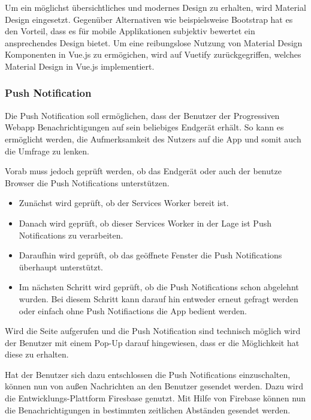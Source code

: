 Um ein möglichst übersichtliches und modernes Design zu erhalten, wird Material Design eingesetzt. Gegenüber Alternativen wie beispielsweise Bootstrap hat es den Vorteil, dass es für mobile Applikationen subjektiv bewertet ein ansprechendes Design bietet. Um eine reibungslose Nutzung von Material Design Komponenten in Vue.js zu ermögichen, wird auf Vuetify zurückgegriffen, welches Material Design in Vue.js implementiert.

\subsubsection{Push Notification}
Die Push Notification soll ermöglichen, dass der Benutzer der Progressiven Webapp Benachrichtigungen auf sein beliebiges Endgerät erhält. So kann es ermöglicht werden, die Aufmerksamkeit des Nutzers auf die App und somit auch die Umfrage zu lenken. 

Vorab muss jedoch geprüft werden, ob das Endgerät oder auch der benutze Browser die Push Notifications unterstützen. 

\begin{itemize}
\item Zunächst wird geprüft, ob der Services Worker bereit ist. 
\item Danach wird geprüft, ob dieser Services Worker in der Lage ist Push Notifications zu verarbeiten.
\item Daraufhin wird geprüft, ob das geöffnete Fenster die Push Notifications überhaupt unterstützt.
\item Im nächsten Schritt wird geprüft, ob die Push Notifications schon abgelehnt wurden. Bei diesem Schritt kann darauf hin entweder erneut gefragt werden oder einfach ohne Push Notifiactions die App bedient werden.
\end{itemize} 

Wird die Seite aufgerufen und die Push Notification sind technisch möglich wird der Benutzer mit einem Pop-Up darauf hingewiesen, dass er die Möglichkeit hat diese zu erhalten. 

Hat der Benutzer sich dazu entschlossen die Push Notifications einzuschalten, können nun von außen Nachrichten an den Benutzer gesendet werden. Dazu wird die Entwicklungs-Plattform Firesbase genutzt. Mit Hilfe von Firebase können nun die Benachrichtigungen in bestimmten zeitlichen Abständen gesendet werden.
